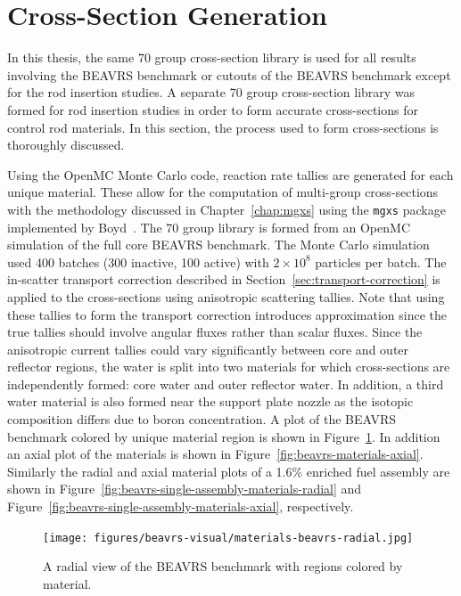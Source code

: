 \section{Cross-Section Generation}
\label{sec:beavrs-xs-gen}

In this thesis, the same 70 group cross-section library is used for all results involving the BEAVRS benchmark or cutouts of the BEAVRS benchmark except for the rod insertion studies. A separate 70 group cross-section library was formed for rod insertion studies in order to form accurate cross-sections for control rod materials. In this section, the process used to form cross-sections is thoroughly discussed.

Using the OpenMC Monte Carlo code, reaction rate tallies are generated for each unique material. These allow for the computation of multi-group cross-sections with the methodology discussed in Chapter~\ref{chap:mgxs} using the \texttt{mgxs} package implemented by Boyd~\cite{boyd2017thesis}. The 70 group library is formed from an OpenMC simulation of the full core BEAVRS benchmark. The Monte Carlo simulation used 400 batches (300 inactive, 100 active) with $2 \times 10^8$ particles per batch. The in-scatter transport correction described in Section~\ref{sec:transport-correction} is applied to the cross-sections using anisotropic scattering tallies. Note that using these tallies to form the transport correction introduces approximation since the true tallies should involve angular fluxes rather than scalar fluxes. Since the anisotropic current tallies could vary significantly between core and outer reflector regions, the water is split into two materials for which cross-sections are independently formed: core water and outer reflector water. In addition, a third water material is also formed near the support plate nozzle as the isotopic composition differs due to boron concentration. A plot of the BEAVRS benchmark colored by unique material region is shown in Figure~\ref{fig:beavrs-materials-radial}. In addition an axial plot of the materials is shown in Figure~\ref{fig:beavrs-materials-axial}. Similarly the radial and axial material plots of a 1.6\% enriched fuel assembly are shown in Figure~\ref{fig:beavrs-single-assembly-materials-radial} and Figure~\ref{fig:beavrs-single-assembly-materials-axial}, respectively.


\begin{figure}[h!]
	\centering
	\texttt{[image: figures/beavrs-visual/materials-beavrs-radial.jpg]}
	\caption{A radial view of the BEAVRS benchmark with regions colored by material.}
	\label{fig:beavrs-materials-radial}
\end{figure} 

